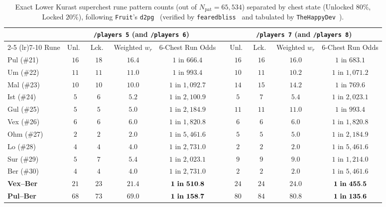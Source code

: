 \documentclass[11pt,reqno]{amsart}
\theoremstyle{definition}
\begin{document}
\begin{table}[htbp]
\centering
\caption{Exact Lower Kurast superchest rune pattern counts (out of $N_{\text{pat}} = 65{,}534$) separated by chest state (Unlocked $80\%$, Locked $20\%$), following \texttt{Fruit}'s \texttt{d2pg}~\cite{fruit_d2pg} (verified by \texttt{fearedbliss}~\cite{fearedbliss_lk} and tabulated by \texttt{TheHappyDev}~\cite{thehappydev_d2runes}).}
\label{tab:patterns}
\footnotesize
\setlength{\tabcolsep}{4.5pt}
\begin{tabular}{@{}lccccccccc@{}}
\toprule
& \multicolumn{4}{c}{\textbf{\texttt{/players 5} (and \texttt{/players 6})}} & & \multicolumn{4}{c}{\textbf{\texttt{/players 7} (and \texttt{/players 8})}} \\
\cmidrule(lr){2-5} \cmidrule(lr){7-10}
Rune & Unl.\ & Lck.\ & Weighted $w_r$ & $6$-Chest Run Odds & & Unl.\ & Lck.\ & Weighted $w_r$ & $6$-Chest Run Odds \\
\midrule
Pul (\#21) & $16$ & $18$ & $16.4$ & $1\text{ in }666.4$   & & $16$ & $16$ & $16.0$ & $1\text{ in }683.1$ \\
Um (\#22)  & $11$ & $11$ & $11.0$ & $1\text{ in }993.4$   & & $10$ & $11$ & $10.2$ & $1\text{ in }1{,}071.2$ \\
Mal (\#23) & $10$ & $10$ & $10.0$ & $1\text{ in }1{,}092.7$ & & $14$ & $15$ & $14.2$ & $1\text{ in }769.6$ \\
Ist (\#24) & $5$  & $6$  & $5.2$  & $1\text{ in }2{,}100.9$ & & $5$  & $7$  & $5.4$  & $1\text{ in }2{,}023.1$ \\
Gul (\#25) & $5$  & $5$  & $5.0$  & $1\text{ in }2{,}184.9$ & & $11$ & $11$ & $11.0$ & $1\text{ in }993.4$ \\
\midrule
Vex (\#26) & $6$  & $6$  & $6.0$  & $1\text{ in }1{,}820.8$ & & $6$  & $6$  & $6.0$  & $1\text{ in }1{,}820.8$ \\
Ohm (\#27) & $2$  & $2$  & $2.0$  & $1\text{ in }5{,}461.6$ & & $5$  & $5$  & $5.0$  & $1\text{ in }2{,}184.9$ \\
Lo (\#28)  & $4$  & $4$  & $4.0$  & $1\text{ in }2{,}731.0$ & & $2$  & $2$  & $2.0$  & $1\text{ in }5{,}461.6$ \\
Sur (\#29) & $5$  & $7$  & $5.4$  & $1\text{ in }2{,}023.1$ & & $9$  & $9$  & $9.0$  & $1\text{ in }1{,}214.0$ \\
Ber (\#30) & $4$  & $4$  & $4.0$  & $1\text{ in }2{,}731.0$ & & $2$  & $2$  & $2.0$  & $1\text{ in }5{,}461.6$ \\
\midrule
\textbf{Vex--Ber} & $21$ & $23$ & $\mathbf{21.4}$ & $\mathbf{1\text{ \textbf{in} }510.8}$ & & $24$ & $24$ & $\mathbf{24.0}$ & $\mathbf{1\text{ \textbf{in} }455.5}$ \\
\textbf{Pul--Ber} & $68$ & $73$ & $\mathbf{69.0}$ & $\mathbf{1\text{ \textbf{in} }158.7}$ & & $80$ & $84$ & $\mathbf{80.8}$ & $\mathbf{1\text{ \textbf{in} }135.6}$ \\
\bottomrule
\end{tabular}
\end{table}
\end{document}
